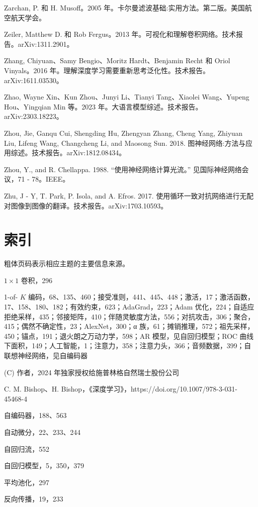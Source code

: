 \documentclass[10pt]{report}
\begin{document}
Zarchan, P. 和 H. Musoff。2005 年。卡尔曼滤波基础:实用方法。第二版。美国航空航天学会。

Zeiler, Matthew D. 和 Rob Fergus。2013 年。可视化和理解卷积网络。技术报告。arXiv:1311.2901。

Zhang, Chiyuan、Samy Bengio、Moritz Hardt、Benjamin Recht 和 Oriol Vinyals。2016 年。理解深度学习需要重新思考泛化性。技术报告。arXiv:1611.03530。

Zhao, Wayne Xin、Kun Zhou、Junyi Li、Tianyi Tang、Xiaolei Wang、Yupeng Hou、Yingqian Min 等。2023 年。大语言模型综述。技术报告。arXiv:2303.18223。

Zhou, Jie, Ganqu Cui, Shengding Hu, Zhengyan Zhang, Cheng Yang, Zhiyuan Liu, Lifeng Wang, Changcheng Li, and Maosong Sun. 2018. 图神经网络:方法与应用综述。技术报告。arXiv:1812.08434。

Zhou, Y., and R. Chellappa. 1988. “使用神经网络计算光流。” 见国际神经网络会议，71 - 78。IEEE。

Zhu, J - Y, T. Park, P. Isola, and A. Efros. 2017. 使用循环一致对抗网络进行无配对图像到图像的翻译。技术报告。arXiv:1703.10593。

\section*{索引}

粗体页码表示相应主题的主要信息来源。

\(1 \times  1\) 卷积，296

1-of- \(K\) 编码，68、135、460；接受准则，441、445、448；激活，17；激活函数，17、158、180、182；有效约束，623；AdaGrad，223；Adam 优化，224；自适应拒绝采样，435；邻接矩阵，410；伴随灵敏度方法，556；对抗攻击，306；聚合，415；偶然不确定性，23；AlexNet，300；α 族，61；摊销推理，572；祖先采样，450；锚点，191；退火朗之万动力学，598；AR 模型，见自回归模型；ROC 曲线下面积，149；人工智能，1；注意力，358；注意力头，366；音频数据，399；自联想神经网络，见自编码器

(C) 作者，2024 年独家授权给施普林格自然瑞士股份公司

C. M. Bishop、H. Bishop，《深度学习》，https://doi.org/10.1007/978-3-031-45468-4

自编码器，188、563

自动微分，22、233、244

自回归流，552

自回归模型，5，350，379

平均池化，297

反向传播，19，233
\end{document}
